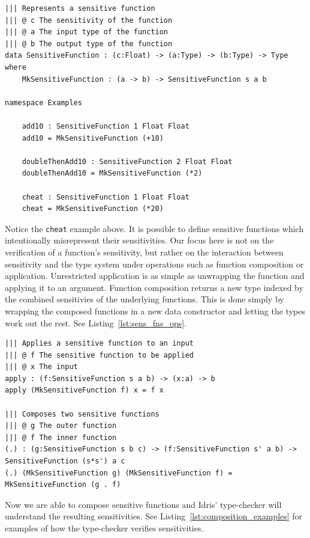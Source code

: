 \documentclass[12pt]{report}
\begin{document}
\begin{lstlisting}[caption={Representing sensitive functions},label={lst:rep_sens_fns}]
||| Represents a sensitive function
||| @ c The sensitivity of the function
||| @ a The input type of the function
||| @ b The output type of the function
data SensitiveFunction : (c:Float) -> (a:Type) -> (b:Type) -> Type where
    MkSensitiveFunction : (a -> b) -> SensitiveFunction s a b

namespace Examples

    add10 : SensitiveFunction 1 Float Float
    add10 = MkSensitiveFunction (+10)

    doubleThenAdd10 : SensitiveFunction 2 Float Float
    doubleThenAdd10 = MkSensitiveFunction (*2)

    cheat : SensitiveFunction 1 Float Float
    cheat = MkSensitiveFunction (*20)
\end{lstlisting}

Notice the \texttt{cheat} example above.
It is possible to define sensitive functions which intentionally misrepresent their sensitivities.
Our focus here is not on the verification of a function's sensitivity, but rather on the interaction between sensitivity and the type system under operations such as function composition or application.
Unrestricted application is as simple as unwrapping the function and applying it to an argument.
Function composition returns a new type indexed by the combined sensitivies of the underlying functions.
This is done simply by wrapping the composed functions in a new data constructor and letting the types work out the rest.
See Listing~\ref{lst:sens_fns_ops}.

\begin{lstlisting}[caption={Sensitive function operations},label={lst:sens_fns_ops}]
||| Applies a sensitive function to an input
||| @ f The sensitive function to be applied
||| @ x The input
apply : (f:SensitiveFunction s a b) -> (x:a) -> b
apply (MkSensitiveFunction f) x = f x

||| Composes two sensitive functions
||| @ g The outer function
||| @ f The inner function
(.) : (g:SensitiveFunction s b c) -> (f:SensitiveFunction s' a b) -> SensitiveFunction (s*s') a c
(.) (MkSensitiveFunction g) (MkSensitiveFunction f) = MkSensitiveFunction (g . f)
\end{lstlisting}

Now we are able to compose sensitive functions and Idris' type-checker will understand the resulting sensitivities.
See Listing~\ref{lst:composition_examples} for examples of how the type-checker verifies sensitivities.
\end{document}

